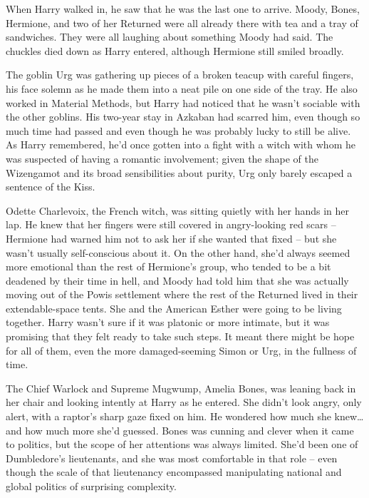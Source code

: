 \mybreak

When Harry walked in, he saw that he was the last one to arrive. Moody,
Bones, Hermione, and two of her Returned were all already there with tea
and a tray of sandwiches. They were all laughing about something Moody
had said. The chuckles died down as Harry entered, although Hermione
still smiled broadly.

The goblin Urg was gathering up pieces of a broken teacup with careful
fingers, his face solemn as he made them into a neat pile on one side of
the tray. He also worked in Material Methods, but Harry had noticed that
he wasn't sociable with the other goblins. His two-year stay in Azkaban
had scarred him, even though so much time had passed and even though he
was probably lucky to still be alive. As Harry remembered, he'd once
gotten into a fight with a witch with whom he was suspected of having a
romantic involvement; given the shape of the Wizengamot and its broad
sensibilities about purity, Urg only barely escaped a sentence of the
Kiss.

Odette Charlevoix, the French witch, was sitting quietly with her hands
in her lap. He knew that her fingers were still covered in angry-looking
red scars -- Hermione had warned him not to ask her if she wanted that
fixed -- but she wasn't usually self-conscious about it. On the other
hand, she'd always seemed more emotional than the rest of Hermione's
group, who tended to be a bit deadened by their time in hell, and Moody
had told him that she was actually moving out of the Powis settlement
where the rest of the Returned lived in their extendable-space tents.
She and the American Esther were going to be living together. Harry
wasn't sure if it was platonic or more intimate, but it was promising
that they felt ready to take such steps. It meant there might be hope
for all of them, even the more damaged-seeming Simon or Urg, in the
fullness of time.

The Chief Warlock and Supreme Mugwump, Amelia Bones, was leaning back in
her chair and looking intently at Harry as he entered. She didn't look
angry, only alert, with a raptor's sharp gaze fixed on him. He wondered
how much she knew\ldots{} and how much more she'd guessed. Bones was
cunning and clever when it came to politics, but the scope of her
attentions was always limited. She'd been one of Dumbledore's
lieutenants, and she was most comfortable in that role -- even though
the scale of that lieutenancy encompassed manipulating national and
global politics of surprising complexity.

